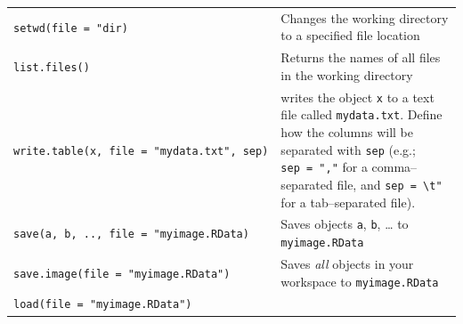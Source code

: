 \documentclass[]{book}
\theoremstyle{definition}
\theoremstyle{definition}
\theoremstyle{remark}
\begin{document}
\begin{longtable}[]{@{}ll@{}}
\begin{minipage}[t]{0.34\columnwidth}\raggedright\strut
\texttt{setwd(file\ =\ "dir)}\strut
\end{minipage} & \begin{minipage}[t]{0.47\columnwidth}\raggedright\strut
Changes the working directory to a specified file location\strut
\end{minipage}\tabularnewline
\begin{minipage}[t]{0.34\columnwidth}\raggedright\strut
\texttt{list.files()}\strut
\end{minipage} & \begin{minipage}[t]{0.47\columnwidth}\raggedright\strut
Returns the names of all files in the working directory\strut
\end{minipage}\tabularnewline
\begin{minipage}[t]{0.34\columnwidth}\raggedright\strut
\texttt{write.table(x,\ file\ =\ "mydata.txt",\ sep)}\strut
\end{minipage} & \begin{minipage}[t]{0.47\columnwidth}\raggedright\strut
writes the object \texttt{x} to a text file called \texttt{mydata.txt}.
Define how the columns will be separated with \texttt{sep} (e.g.;
\texttt{sep\ =\ ","} for a comma--separated file, and
\texttt{sep\ =\ \textbackslash{}t"} for a tab--separated file).\strut
\end{minipage}\tabularnewline
\begin{minipage}[t]{0.34\columnwidth}\raggedright\strut
\texttt{save(a,\ b,\ ..,\ file\ =\ "myimage.RData)}\strut
\end{minipage} & \begin{minipage}[t]{0.47\columnwidth}\raggedright\strut
Saves objects \texttt{a}, \texttt{b}, \ldots{} to
\texttt{myimage.RData}\strut
\end{minipage}\tabularnewline
\begin{minipage}[t]{0.34\columnwidth}\raggedright\strut
\texttt{save.image(file\ =\ "myimage.RData")}\strut
\end{minipage} & \begin{minipage}[t]{0.47\columnwidth}\raggedright\strut
Saves \emph{all} objects in your workspace to
\texttt{myimage.RData}\strut
\end{minipage}\tabularnewline
\begin{minipage}[t]{0.34\columnwidth}\raggedright\strut
\texttt{load(file\ =\ "myimage.RData")}\strut
\end{minipage} & \begin{minipage}[t]{0.47\columnwidth}\raggedright\strut

\end{minipage}
\end{longtable}
\end{document}
